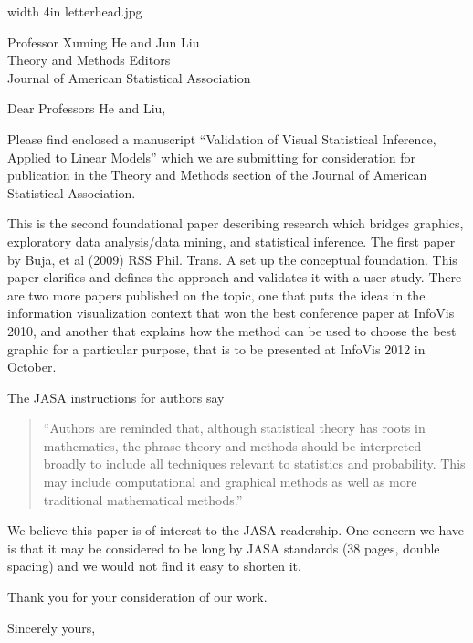 \documentclass{letter}
\makeatletter
\def\apl#1#2{
\begin{letter}{#1}
\signature{Mahbubul Majumder\\
with Heike Hofmann and Dianne Cook\\Department of Statistics\\Iowa State University 
\\Ames, Iowa 50011-1210\\ Phone (515) 294 3440\\{\tt mahbub@iastate.edu}}
\opening{{Dear #2,}}

Please find enclosed a manuscript  ``Validation of Visual
Statistical Inference, Applied to Linear Models'' which we are
submitting for consideration for publication in the
Theory and Methods section of the Journal of American Statistical
Association.

This is the second foundational paper describing research which bridges
graphics, exploratory data analysis/data mining, and statistical
inference. The first paper by Buja, et al (2009) RSS Phil. Trans. A
set up the conceptual foundation. This paper clarifies and defines the
approach and validates it with a user study. There are two more papers
published on the topic, one that puts the ideas in the information
visualization context that won the best conference paper at InfoVis
2010, and another that explains how the method can be used to choose
the best graphic for a particular purpose, that is to be presented at
InfoVis 2012 in October.

The JASA instructions for authors say 

\begin{quote}
``Authors are reminded that, although statistical theory has roots in mathematics, the phrase theory and methods should be interpreted broadly to include all techniques relevant to statistics and probability. This may include computational and graphical methods as well as more traditional mathematical methods.''
\end{quote}
We believe this paper is of interest to  the JASA readership. One concern we have is that it may be
considered to be long by JASA standards (38 pages, double spacing) and
we would not find it easy to shorten it.

Thank you for your consideration of our work.

\closing{Sincerely yours,
}
\end{letter}}
\makeatother
\begin{document}
{{\pdfimage width 4in {letterhead.jpg}}}
\apl{Professor Xuming He and Jun Liu\\Theory and Methods Editors\\Journal of American Statistical Association}{Professors He and Liu}
\end{document}
